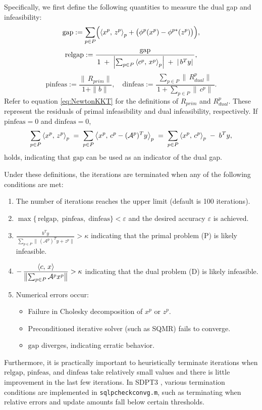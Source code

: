 Specifically, we first define the following quantities to measure the dual gap and infeasibility:
\[
  \mathrm{gap}
  := \sum_{p\in P}
       \Bigl(\left\langle x^p, \, z^p \right\rangle_p + \bigl(\phi^p(x^p) - \phi^{p*}(z^p)\bigr)\Bigr),
\]
\[
  \mathrm{relgap}
  := \frac{\mathrm{gap}}
           {\,1 \;+\;\Bigl|\sum_{p\in P}\left\langle c^p, \, x^p \right\rangle_p\Bigr|
                 \;+\;|\,b^T y|\,},
\]
\[
  \mathrm{pinfeas}
  := \frac{\|\,R_{prim}\|}{\,1 + \|b\|\,},
  \quad
  \mathrm{dinfeas}
  := \frac{\sum_{p\in P}\|\,R^p_{dual}\|}
           {\,1 + \sum_{p\in P}\|\,c^p\|\,}.
\]
Refer to equation \eqref{eq:NewtonKKT} for the definitions of $R_{prim}$ and $R_{dual}^p$.
These represent the residuals of primal infeasibility and dual infeasibility, respectively.
If $\mathrm{pinfeas} = 0$ and $\mathrm{dinfeas} = 0$,
\[
  \sum_{p\in P}\left\langle x^p, \, z^p \right\rangle_p 
  \;=\;
  \sum_{p\in P}\left\langle x^p, \, c^p - (\mathcal{A}^p)^T y \right\rangle_p
  \;=\; \sum_{p\in P}\left\langle x^p, \, c^p \right\rangle_p \;-\; b^T y,
\]
holds, indicating that $\mathrm{gap}$ can be used as an indicator of the dual gap.

Under these definitions, the iterations are terminated when any of the following conditions are met:

\begin{enumerate}
    \item The number of iterations reaches the upper limit (default is 100 iterations).
    \item 
      $\displaystyle
      \max\{\,\mathrm{relgap},\;\mathrm{pinfeas},\;\mathrm{dinfeas}\}
      < \varepsilon
      $
      and the desired accuracy $\varepsilon$ is achieved.
    \item 
      $\displaystyle
        \frac{\,b^T y\,}
              {\,\sum_{p\in P}\|\,(\mathcal{A}^p)^T y + z^p\|\!}
      > \kappa
      $
      indicating that the primal problem (P) is likely infeasible.
    \item 
      $\displaystyle
      -\,\frac{\left\langle c, \, x \right\rangle}
              {\bigl\|\sum_{p\in P}\mathcal{A}^p x^p\bigr\|}
      > \kappa
      $
      indicating that the dual problem (D) is likely infeasible.
    \item Numerical errors occur:
      \begin{itemize}
          \item Failure in Cholesky decomposition of $x^p$ or $z^p$.
          \item Preconditioned iterative solver (such as SQMR) fails to converge.
          \item $\mathrm{gap}$ diverges, indicating erratic behavior.
      \end{itemize}
\end{enumerate}

Furthermore, it is practically important to heuristically terminate iterations when $\mathrm{relgap}$, $\mathrm{pinfeas}$, and $\mathrm{dinfeas}$ take relatively small values and there is little improvement in the last few iterations.
In SDPT3 \cite{toh1999}, various termination conditions are implemented in \texttt{sqlpcheckconvg.m}, such as terminating when relative errors and update amounts fall below certain thresholds.

